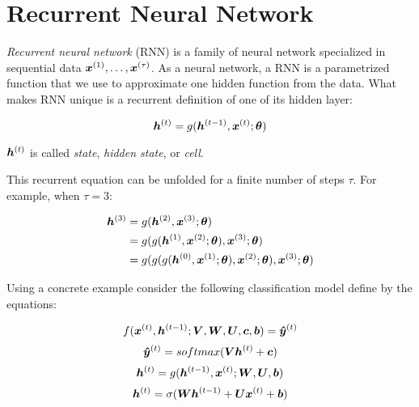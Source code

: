 \section{Recurrent Neural Network}
\label{sec:RNN}


\textit{Recurrent neural network} (RNN) is a family of neural network specialized in sequential data $\bm{x}^{(1)}, \dots, \bm{x}^{(\tau)}$. As a neural network, a RNN is a parametrized function that we use to approximate one hidden function from the data. What makes RNN unique is a recurrent definition of one of its hidden layer:

\begin{equation}
\bm{h}^{(t)} = g(\bm{h}^{(t-1)}, \bm{x}^{(t)}; \bm{\theta})
\end{equation}

$\bm{h}^{(t)}$ is called \textit{state}, \textit{hidden state}, or \textit{cell}.


\par This recurrent equation can be unfolded for a finite number of steps $\tau$. For example, when $\tau =3$:

\begin{align}
\bm{h}^{(3)}& = g(\bm{h}^{(2)}, \bm{x}^{(3)}; \bm{\theta})\\
 & = g(g(\bm{h}^{(1)}, \bm{x}^{(2)}; \bm{\theta}), \bm{x}^{(3)}; \bm{\theta})\\
 & = g(g(g(\bm{h}^{(0)}, \bm{x}^{(1)}; \bm{\theta}), \bm{x}^{(2)}; \bm{\theta}), \bm{x}^{(3)}; \bm{\theta})\\
\end{align}

Using a concrete example consider the following classification model define by the equations:

\begin{equation}
f(\bm{x}^{(t)}, \bm{h}^{(t-1)}; \bm{V}, \bm{W}, \bm{U}, \bm{c}, \bm{b}) = \bm{\hat{y}}^{(t)}
\end{equation}
 \vspace{0.2cm}
\begin{equation}
\bm{\hat{y}}^{(t)} = softmax(\bm{V} \bm{h}^{(t)} + \bm{c})
\end{equation}
\vspace{0.2cm}
 \begin{equation}
\bm{h}^{(t)} = g(\bm{h}^{(t-1)}, \bm{x}^{(t)}; \bm{W},\bm{U}, \bm{b})
\end{equation}
\vspace{0.2cm}
\begin{equation}
\bm{h}^{(t)} = \sigma(\bm{W} \bm{h}^{(t-1)} + \bm{U} \bm{x}^{(t)} + \bm{b})
\end{equation}


